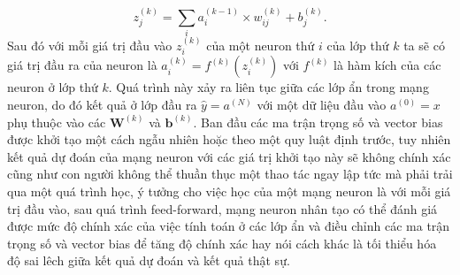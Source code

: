\begin{equation}
	z^{(k)}_j={\sum_i} {a^{(k-1)}_i} \times {w^{(k)}_{ij}} + {{b}^{(k)}_j}.
\end{equation}
Sau đó với mỗi giá trị đầu vào $z^{(k)}_i$ của một neuron thứ $i$ của lớp thứ $k$ ta sẽ có giá trị đầu ra của neuron là $a^{(k)}_i=f^{(k)}\left(z^{(k)}_i\right)$ với $f^{(k)}$ là hàm kích của các neuron ở lớp thứ $k$. Quá trình này xảy ra liên tục giữa các lớp ẩn trong mạng neuron, do đó kết quả ở lớp đầu ra $\widehat{y}=a^{(N)}$ với một dữ liệu đầu vào $a^{(0)}=x$ phụ thuộc vào các $\boldsymbol{W}^{(k)}$ và $\boldsymbol{b}^{(k)}$. Ban đầu các ma trận trọng số và vector bias được khởi tạo một cách ngẫu nhiên hoặc theo một quy luật định trước, tuy nhiên kết quả dự đoán của mạng neuron với các giá trị khởi tạo này sẽ không chính xác cũng như con người không thể thuần thục một thao tác ngay lập tức mà phải trải qua một quá trình học, ý tưởng cho việc học của một mạng neuron là với mỗi giá trị đầu vào, sau quá trình feed-forward, mạng neuron nhân tạo có thể đánh giá được mức độ chính xác của việc tính toán ở các lớp ẩn và điều chỉnh các ma trận trọng số và vector bias để tăng độ chính xác hay nói cách khác là tối thiểu hóa độ sai lêch giữa kết quả dự đoán và kết quả thật sự.

